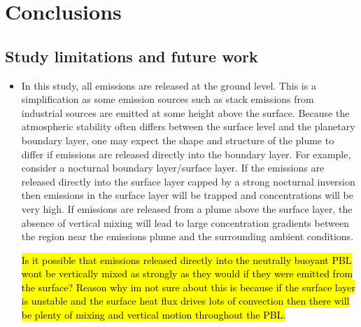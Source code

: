 \chapter{Conclusions}

\section{Study limitations and future work}
\begin{itemize}
\item In this study, all emissions are released at the ground level. This is a simplification as some emission sources such as stack emissions from industrial sources are emitted at some height above the surface. Because the atmospheric stability often differs between the surface level and the planetary boundary layer, one may expect the shape and structure of the plume to differ if emissions are released directly into the boundary layer. For example, consider a nocturnal boundary layer/surface layer. If the emissions are released directly into the surface layer capped by a strong nocturnal inversion then emissions in the surface layer will be trapped and concentrations will be very high. If emissions are released from a plume above the surface layer, the absence of vertical mixing will lead to large concentration gradients between the region near the emissions plume and the surrounding ambient conditions. 

\hl{Is it possible that emissions released directly into the neutrally buoyant PBL wont be vertically mixed as strongly as they would if they were emitted from the surface? Reason why im not sure about this is because if the surface layer is unstable and the surface heat flux drives lots of convection then there will be plenty of mixing and vertical motion throughout the PBL.}
\end{itemize}